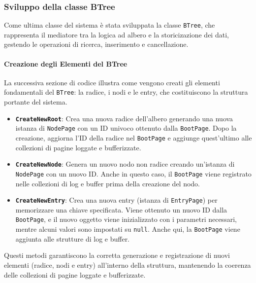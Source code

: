 \documentclass[12pt,a4paper,openright,twoside]{book}
\begin{document}
                \clearpage

            \subsubsection{Sviluppo della classe BTree}

                Come ultima classe del sistema è stata sviluppata la classe \texttt{BTree}, che rappresenta il mediatore tra la logica ad albero e la storicizazione dei dati, gestendo le operazioni di ricerca, inserimento e cancellazione.

                \paragraph{Creazione degli Elementi del BTree}

                    La successiva sezione di codice illustra come vengono creati gli elementi fondamentali del \texttt{BTree}: la radice, i nodi e le entry, che costituiscono la struttura portante del sistema.

                    \begin{itemize}
                        \item \textbf{\texttt{CreateNewRoot}}: Crea una nuova radice dell'albero generando una nuova istanza di \texttt{NodePage} con un ID univoco ottenuto dalla \texttt{BootPage}.
                        Dopo la creazione, aggiorna l'ID della radice nel \texttt{BootPage} e aggiunge quest'ultimo alle collezioni di pagine loggate e bufferizzate.
                        \item \textbf{\texttt{CreateNewNode}}: Genera un nuovo nodo non radice creando un'istanza di \texttt{NodePage} con un nuovo ID.
                        Anche in questo caso, il \texttt{BootPage} viene registrato nelle collezioni di log e buffer prima della creazione del nodo.
                        \item \textbf{\texttt{CreateNewEntry}}: Crea una nuova entry (istanza di \texttt{EntryPage}) per memorizzare una chiave specificata.
                        Viene ottenuto un nuovo ID dalla \texttt{BootPage}, e il nuovo oggetto viene inizializzato con i parametri necessari, mentre alcuni valori sono impostati su \texttt{null}.
                        Anche qui, la \texttt{BootPage} viene aggiunta alle strutture di log e buffer.
                    \end{itemize}

                    Questi metodi garantiscono la corretta generazione e registrazione di nuovi elementi (radice, nodi e entry) all'interno della struttura, mantenendo la coerenza delle collezioni di pagine loggate e bufferizzate.
\end{document}
